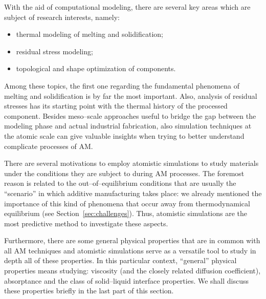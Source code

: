 With the aid of computational modeling, there are several key areas which are subject of research interests, namely:
\begin{itemize}
    \item thermal modeling of melting and solidification;
    \item residual stress modeling;
    \item topological and shape optimization of components.
\end{itemize}

Among these topics, the first one regarding the fundamental phenomena of melting and solidification is by far the most important. Also, analysis of residual stresses has its starting point with the thermal history of the processed component.
Besides meso--scale approaches useful to bridge the gap between the modeling phase and actual industrial fabrication, also simulation techniques at the atomic scale can give valuable insights when trying to better understand complicate processes of AM.

There are several motivations to employ atomistic simulations to study materials under the conditions they are subject to during AM processes. The foremost reason is related to the out--of--equilibrium conditions that are usually the ``scenario'' in which additive manufacturing takes place: we already mentioned the importance of this kind of phenomena that occur away from thermodynamical equilibrium (see Section~\ref{sec:challenges}). Thus, atomistic simulations are the most predictive method to investigate these aspects.

Furthermore, there are some general physical properties that are in common with all AM techniques and atomistic simulations serve as a versatile tool to study in depth all of these properties. In this particular context, ``general'' physical properties means studying: viscosity (and the closely related diffusion coefficient), absorptance and the class of solid--liquid interface properties. We shall discuss these properties briefly in the last part of this section.

